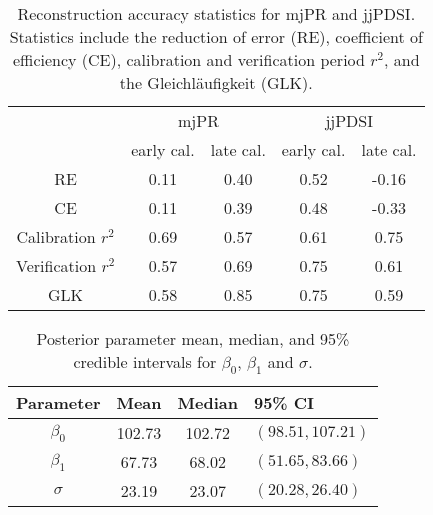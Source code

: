 \begin{table}
\begin{center}
\begin{tabular}{ccccc}
\toprule
 & \multicolumn{2}{c}{mjPR} & \multicolumn{2}{c}{jjPDSI} \\ \cmidrule(lr){2-3} \cmidrule(lr){4-5} 
 & early cal. & late cal. & early cal. & late cal.\\ \midrule
RE &  0.11 & 0.40 & 0.52 & -0.16 \\
CE & 0.11 & 0.39 & 0.48 & -0.33\\
Calibration $r^2$ & 0.69 & 0.57 & 0.61 & 0.75\\
Verification $r^2$ & 0.57 & 0.69 & 0.75 & 0.61 \\
GLK & 0.58 & 0.85 & 0.75 & 0.59\\ \bottomrule
\end{tabular}
\caption{Reconstruction accuracy statistics for mjPR and jjPDSI. Statistics include the reduction of error (RE), coefficient of efficiency (CE), calibration and verification period $r^2$, and the Gleichl\"{a}ufigkeit (GLK).}
\end{center}
\label{table:reconStats}
\vspace{2cm}
\end{table}

\begin{table}
\begin{center}
\begin{tabular}{cccl} \toprule
Parameter & Mean   & Median & 95\% CI \\ \midrule
$\beta_0$ & 102.73 & 102.72       & $(98.51, 107.21)$ \\
$\beta_1$ & 67.73  & 68.02        &  $(51.65, 83.66)$\\
$\sigma$  & 23.19  & 23.07        & $(20.28, 26.40)$   \\  \bottomrule
\end{tabular}
\caption{Posterior parameter mean, median, and 95\% credible intervals for $\beta_0$, $\beta_1$ and $\sigma$.}
\end{center}
\label{table:mcmcResults}
\vspace{2cm}
\end{table}


